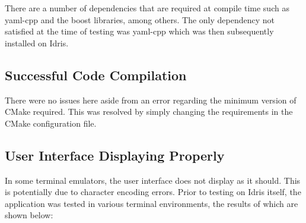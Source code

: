 There are a number of dependencies that are required at compile time such as {\selectfont yaml-cpp} and the {\selectfont boost} libraries, among others. The only dependency not satisfied at the time of testing was {\selectfont yaml-cpp} which was then subsequently installed on Idris.

\subsection{Successful Code Compilation}

There were no issues here aside from an error regarding the minimum version of CMake required. This was resolved by simply changing the requirements in the CMake configuration file.

\subsection{User Interface Displaying Properly}
\label{ui_display_prop}

In some terminal emulators, the user interface does not display as it should. This is potentially due to character encoding errors. Prior to testing on Idris itself, the application was tested in various terminal environments, the results of which are shown below:


